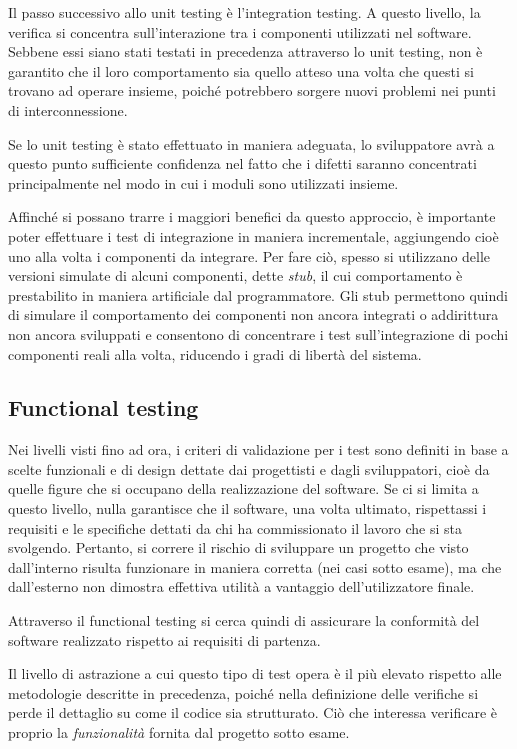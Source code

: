Il passo successivo allo unit testing è l'integration testing. A questo livello, la verifica si concentra sull'interazione tra i componenti utilizzati nel software. Sebbene essi siano stati testati in precedenza attraverso lo unit testing, non è garantito che il loro comportamento sia quello atteso una volta che questi si trovano ad operare insieme, poiché potrebbero sorgere nuovi problemi nei punti di interconnessione.

Se lo unit testing è stato effettuato in maniera adeguata, lo sviluppatore avrà a questo punto sufficiente confidenza nel fatto che i difetti saranno concentrati principalmente nel modo in cui i moduli sono utilizzati insieme.

Affinché si possano trarre i maggiori benefici da questo approccio, è importante poter effettuare i test di integrazione in maniera incrementale, aggiungendo cioè uno alla volta i componenti da integrare. Per fare ciò, spesso si utilizzano delle versioni simulate di alcuni componenti, dette \emph{stub}, il cui comportamento è prestabilito in maniera artificiale dal programmatore. Gli stub permettono quindi di simulare il comportamento dei componenti non ancora integrati o addirittura non ancora sviluppati e consentono di concentrare i test sull'integrazione di pochi componenti reali alla volta, riducendo i gradi di libertà del sistema.

\subsection{Functional testing}

Nei livelli visti fino ad ora, i criteri di validazione per i test sono definiti in base a scelte funzionali e di design dettate dai progettisti e dagli sviluppatori, cioè da quelle figure che si occupano della realizzazione del software. 
Se ci si limita a questo livello, nulla garantisce che il software, una volta ultimato, rispettassi i requisiti e le specifiche dettati da chi ha commissionato il lavoro che si sta svolgendo. Pertanto, si correre il rischio di sviluppare un progetto
che visto dall'interno risulta funzionare in maniera corretta (nei casi sotto esame), ma che dall'esterno non dimostra effettiva utilità a vantaggio dell'utilizzatore finale.

Attraverso il functional testing si cerca quindi di assicurare la conformità del software realizzato rispetto ai requisiti di partenza. 

Il livello di astrazione a cui questo tipo di test opera è il più elevato rispetto alle metodologie descritte in precedenza, poiché nella definizione delle verifiche si perde il dettaglio su come il codice sia strutturato. Ciò che interessa verificare è proprio la \emph{funzionalità} fornita dal progetto sotto esame.


